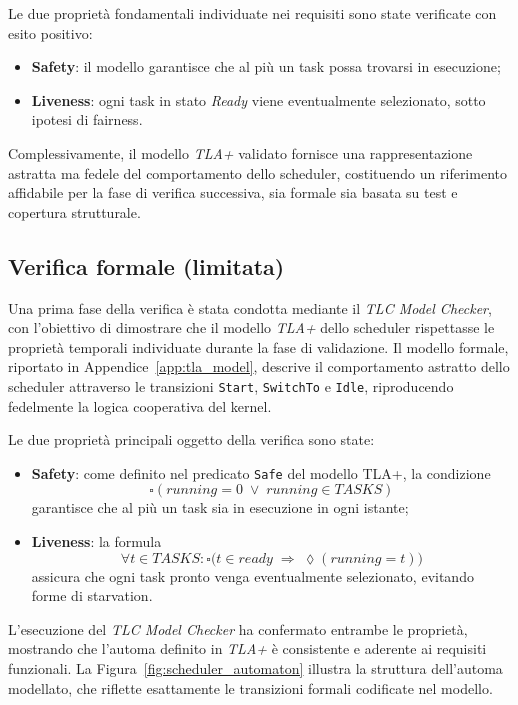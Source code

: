 \documentclass[italian, Lau, oneside]{sapthesis} %
\begin{document}
Le due proprietà fondamentali individuate nei requisiti sono state verificate con esito positivo:

\begin{itemize}
    \item \textbf{Safety}: il modello garantisce che al più un task possa trovarsi in esecuzione;
    \item \textbf{Liveness}: ogni task in stato \textit{Ready} viene eventualmente selezionato, sotto ipotesi di fairness.
\end{itemize}

Complessivamente, il modello \textit{TLA+} validato fornisce una rappresentazione astratta ma fedele del comportamento dello scheduler, costituendo un riferimento affidabile per la fase di verifica successiva, sia formale sia basata su test e copertura strutturale.


\subsection{Verifica formale (limitata)}

Una prima fase della verifica è stata condotta mediante il \textit{TLC Model Checker}, con l’obiettivo di dimostrare che il modello \textit{TLA+} dello scheduler rispettasse le proprietà temporali individuate durante la fase di validazione. Il modello formale, riportato in Appendice~\ref{app:tla_model}, descrive il comportamento astratto dello scheduler attraverso le transizioni \texttt{Start}, \texttt{SwitchTo} e \texttt{Idle}, riproducendo fedelmente la logica cooperativa del kernel.

Le due proprietà principali oggetto della verifica sono state:

\begin{itemize}
    \item \textbf{Safety}: come definito nel predicato \texttt{Safe} del modello TLA+, la condizione
    \[
        \square \left( running = 0 \;\lor\; running \in TASKS \right)
    \]
    garantisce che al più un task sia in esecuzione in ogni istante;
    \item \textbf{Liveness}: la formula
    \[
        \forall t \in TASKS:  \square \big( t \in ready \;\Rightarrow\; \lozenge (running = t) \big)
    \]
    assicura che ogni task pronto venga eventualmente selezionato, evitando forme di starvation.
\end{itemize}

L’esecuzione del \textit{TLC Model Checker} ha confermato entrambe le proprietà, mostrando che l’automa definito in \textit{TLA+} è consistente e aderente ai requisiti funzionali. La Figura~\ref{fig:scheduler_automaton} illustra la struttura dell’automa modellato, che riflette esattamente le transizioni formali codificate nel modello.
\end{document}
